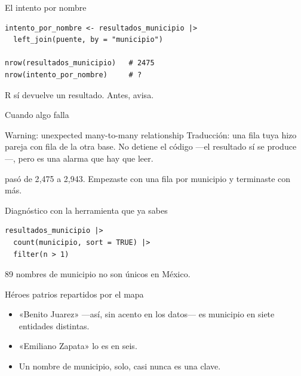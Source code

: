 \begin{frame}[fragile]{El intento por nombre}
\begin{lstlisting}
intento_por_nombre <- resultados_municipio |>
  left_join(puente, by = "municipio")

nrow(resultados_municipio)   # 2475
nrow(intento_por_nombre)     # ?
\end{lstlisting}

  \vspace{0.5em}
  {\small R sí devuelve un resultado. Antes, avisa.}
\end{frame}

\begin{frame}{Cuando algo falla}
  \vspace{0.4em}
  \begin{errorbox}{Warning: unexpected many-to-many relationship}
    Traducción: una fila tuya hizo pareja con  fila de la
    otra base. No detiene el código —el resultado sí se produce—, pero es
    una alarma que hay que leer.

    \vspace{0.5em}
     pasó de 2{,}475 a 2{,}943. Empezaste con una fila por
    municipio y terminaste con más.
  \end{errorbox}
\end{frame}

\begin{frame}[fragile]{Diagnóstico con la herramienta que ya sabes}
\begin{lstlisting}
resultados_municipio |>
  count(municipio, sort = TRUE) |>
  filter(n > 1)
\end{lstlisting}

  \vspace{0.7em}
  89 nombres de municipio no son únicos en México.
\end{frame}

\begin{frame}{Héroes patrios repartidos por el mapa}
  \vspace{0.4em}
  \begin{itemize}\setlength{\itemsep}{0.9em}
    \item<1-> «Benito Juarez» —así, sin acento en los datos— es municipio en
          \ac{siete} entidades distintas.
    \item<2-> «Emiliano Zapata» lo es en \ac{seis}.
    \item<3-> Un nombre de municipio, solo, casi nunca es una clave.
  \end{itemize}

  \vspace{1.1em}
\end{frame}

